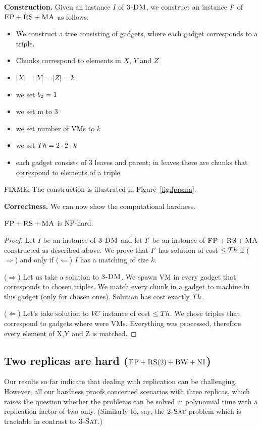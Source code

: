 \textbf{Construction.}
Given an instance $I$ of $\textsc{3-DM}$, we construct an instance $I'$ of
$\textsc{FP}+\textsc{RS}+\textsc{MA}$ as follows:
\begin{itemize}
\item We construct a tree consisting of gadgets, where each gadget corresponds to a triple.
\item Chunks correspond to elements in $X$, $Y$ and $Z$
\item $|X| = |Y| = |Z| = k$
\item we set $b_2=1$
\item we set m to 3
\item we set number of VMs to $k$
\item we set $Th=2 \cdot 2 \cdot k$
\item each gadget consists of 3 leaves and parent; in leaves there are
  chunks that correspond to elements of a triple
\end{itemize}

FIXME: The construction is illustrated in Figure~\ref{fig:fprsma}.

\textbf{Correctness.}
We can now show the computational hardness.
\begin{theorem}
$\textsc{FP}+\textsc{RS}+\textsc{MA}$ is NP-hard.
\end{theorem}
\begin{proof}
Let $I$ be an instance of $\textsc{3-DM}$ and let $I'$ be an instance of
$\textsc{FP}+\textsc{RS}+\textsc{MA}$ constructed as described above.
We prove that $I'$ has solution of cost $\leq Th$ if ($\Rightarrow$) and only if
($\Leftarrow$)
$I$ has a matching of size $k$.

($\Rightarrow$) Let us take a solution to $\textsc{3-DM}$. We spawn VM in every
gadget that corresponds to chosen triples. We match every chunk in a
gadget to machine in this gadget (only for chosen ones). Solution has
cost exactly $Th$.

($\Leftarrow$) Let's take solution to $VC$ instance of cost $\leq Th$. We
chose triples that correspond to gadgets where were VMs. Everything
was processed, therefore every element of X,Y and Z is matched.
\end{proof}


\subsection{Two replicas are hard ($\textsc{FP}+\textsc{RS}(2)+\textsc{BW}+\textsc{NI}$)}\label{ssec:two}

Our results so far indicate that dealing with replication can be challenging.
However, all our hardness proofs concerned scenarios with three replicas,
which raises the question whether the problems can be solved in polynomial time
with a replication factor of two only. (Similarly to, say, the $\textsc{2-Sat}$ problem
which is tractable in contrast to $\textsc{3-Sat}$.)

